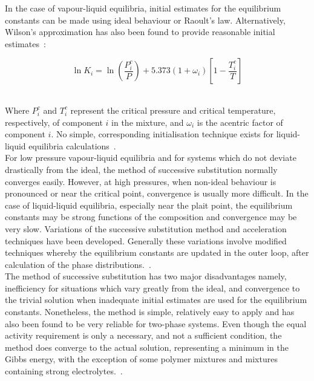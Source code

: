 In the case of vapour-liquid equilibria, initial estimates for the equilibrium constants can be made using ideal behaviour or Raoult's law. Alternatively, Wilson's approximation has also been found to provide reasonable initial estimates~\cite{ComputerCalculationsVLEandLLE, ThermodynamicModels, PhaseEquilCalcsEasyandHard}:\

\begin{equation}
\ln K_{i} = \ln \left(\dfrac{P_{i}^{c}}{P}\right) + 5.373\left(1+ \omega_{i}\right)\left[1-\dfrac{T_{i}^{c}}{T}\right]
\end{equation}\


Where $P_{i}^{c}$ and $T_{i}^{c}$ represent the critical pressure and critical temperature, respectively, of component $i$ in the mixture, and $\omega_{i}$ is the acentric factor of component $i$. No simple, corresponding initialisation technique exists for liquid-liquid equilibria calculations~\cite{ComputerCalculationsVLEandLLE, ThermodynamicModels}.\\

For low pressure vapour-liquid equilibria and for systems which do not deviate drastically from the ideal, the method of successive substitution normally converges easily. However, at high pressures, when non-ideal behaviour is pronounced or near the critical point, convergence is usually more difficult. In the case of liquid-liquid equilibria, especially near the plait point, the equilibrium constants may be strong functions of the composition and convergence may be very slow. Variations of the successive substitution method and acceleration techniques have been developed. Generally these variations involve modified techniques whereby the equilibrium constants are updated in the outer loop, after calculation of the phase distributions.~\cite{ComputerCalculationsVLEandLLE, ThermodynamicModels, HybridFlashCalculations, PhaseEquilCalcsEasyandHard}.\\

The method of successive substitution has two major disadvantages namely, inefficiency for situations which vary greatly from the ideal, and convergence to the trivial solution when inadequate initial estimates are used for the equilibrium constants. Nonetheless, the method is simple, relatively easy to apply and has also been found to be very reliable for two-phase systems. Even though the equal activity requirement is only a necessary, and not a sufficient condition, the method does converge to the actual solution, representing a minimum in the Gibbs energy, with the exception of some polymer mixtures and mixtures containing strong electrolytes.~\cite{ThermodynamicModels, ComputerCalculationsVLEandLLE, HybridFlashCalculations}.\\

